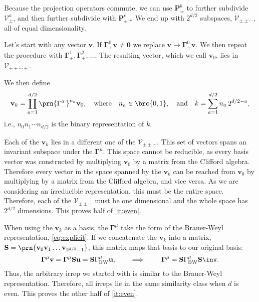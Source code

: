 \documentclass[11pt]{article}
\newcommand{\Gammab}{\boldsymbol{\Gamma}}
\renewcommand{\S}{\mathbf{S}}
\begin{document}
\begin{appendix}
Because the projection operators commute, we can use \(\mathbf{P}^b_\pm\) to further subdivide \(\mathcal{V}^a_\pm\), and then further subdivide with \(\mathbf{P}^c_\pm\)\dots
We end up with \(2^{d/2}\) subspaces, \(\mathcal{V}_{\pm\pm\cdots}\), all of equal dimensionality. 

Let's start with any vector \(\mathbf{v}\). 
If \(\Gammab^0_+ \mathbf{v} \neq \mathbf{0}\) we replace \(\mathbf{v} \to \Gammab^0_+ \mathbf{v}\).
We then repeat the procedure with \(\Gammab^1_+,\Gammab^2_+,\dots\).
The resulting vector, which we call \(\mathbf{v}_0\), lies in \(\mathcal{V}_{++\cdots+}\).

We then define
%
\begin{equation}\label{eq:BWstates}
  \mathbf{v}_k = \prod_{a=1}^{d/2} \prn{\Gamma^a_-}^{n_a} \mathbf{v}_0,
  \quad \text{where}\quad
  n_a \in \brc{0,1},
  \quad \text{and}\quad
  k = \sum_{a=1}^{d/2} n_a \, 2^{d/2 - a},
\end{equation}
%
i.e., \( n_0 n_1 \cdots n_{d/2} \) is the binary representation of \(k\).

Each of the \(\mathbf{v}_k\) lies in a different one of the \(\mathcal{V}_{\pm\pm\cdots}\).
This set of vectors spans an invariant subspace under the \(\Gammab^\mu\).
This space cannot be reducible, as every basis vector was constructed by multiplying \(\mathbf{v}_0\) by a matrix from the Clifford algebra.
Therefore every vector in the space spanned by the \(\mathbf{v}_k\) can be reached from \(\mathbf{v}_0\) by multiplying by a matrix from the Clifford algebra, and vice versa.
As we are considering an irreducible representation, this must be the entire space.
Therefore, each of the \(\mathcal{V}_{\pm\pm\cdots}\) must be one dimensional and the whole space has \(2^{d/2}\) dimensions.
This proves half of \cref{it:even}.

When using the \(\mathbf{v}_k\) as a basis, the \(\Gammab^\mu\) take the form of the Brauer-Weyl representation, \cref{eq:explicit}.
If we concatenate the \(\mathbf{v}_k\) into a matrix, \( \S = \prn{ \mathbf{v}_0 \mathbf{v}_1 \dots \mathbf{v}_{2^{d/2}-1} }\), this matrix maps that basis to our original basis:
%
\begin{equation}\label{eq:similarBWeven}
  \Gammab^\mu \mathbf{v}
    = \Gammab^\mu \S \mathbf{u}
    = \S \Gamma^\mu_\text{BW} \mathbf{u},
  \qquad \implies \qquad
  \Gammab^\mu = \S \Gamma^\mu_\text{BW} \S\inv.
\end{equation}
%
Thus, the arbitrary irrep we started with is similar to the Brauer-Weyl representation.
Therefore, all irreps lie in the same similarity class when \(d\) is even.
This proves the other half of \cref{it:even}.


\end{appendix}
\end{document}
